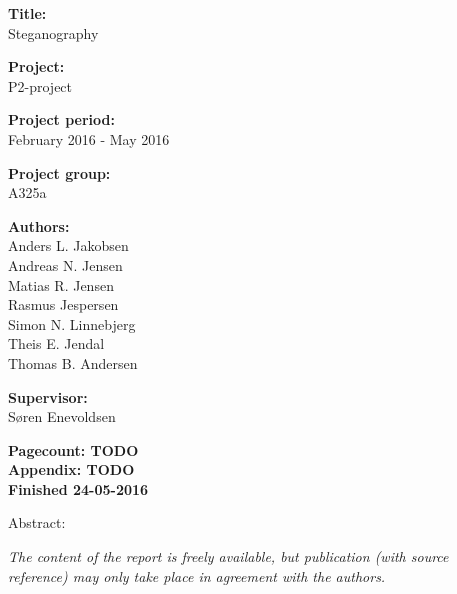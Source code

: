 \begin{minipage}[t]{0.48\textwidth}
\textbf{Title:} \\[5pt]\bigskip\hspace{2ex}
Steganography

\textbf{Project:} \\[5pt]\bigskip\hspace{2ex}
P2-project

\textbf{Project period:} \\[5pt]\bigskip\hspace{2ex}
February 2016 - May 2016

\textbf{Project group:} \\[5pt]\bigskip\hspace{2ex}
A325a	

\textbf{Authors:} \\[5pt]\hspace*{2ex}
Anders L. Jakobsen \\\hspace*{2ex}
Andreas N. Jensen \\\hspace*{2ex}
Matias R. Jensen \\\hspace*{2ex}
Rasmus Jespersen \\\hspace*{2ex}
Simon N. Linnebjerg \\\hspace*{2ex}
Theis E. Jendal\\\bigskip\hspace{2ex}
Thomas B. Andersen

\textbf{Supervisor:} \\[5pt]\hspace*{2ex}
Søren Enevoldsen

\vspace*{1cm}

\textbf{Pagecount: TODO} \\
\textbf{Appendix: TODO} \\ 
\textbf{Finished 24-05-2016}

\end{minipage}
\hfill
\begin{minipage}[t]{0.483\textwidth}
Abstract: \\[5pt]
\fbox{\parbox{7cm}{\bigskip\bigskip}}
\end{minipage}

\vfill

{\footnotesize\itshape The content of the report is freely available, but publication (with source reference) may only take place in agreement with the authors.}

